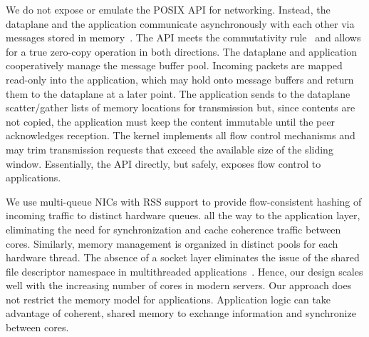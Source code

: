  We do
not expose or emulate the POSIX API for networking.  Instead, the
dataplane and the application communicate asynchronously with each
other via messages stored in
memory~\cite{DBLP:conf/osdi/HanMCR12,DBLP:journals/cacm/Rizzo12}.  The API meets the
commutativity rule~\cite{DBLP:conf/sosp/ClementsKZMK13} and allows for
a true zero-copy operation in both directions. The dataplane and
application cooperatively manage the message buffer pool. Incoming
packets are mapped read-only into the application, which may hold onto
message buffers and return them to the dataplane at a later point.
The application sends to the dataplane scatter/gather lists of memory
locations for transmission but, since contents are not copied, the
application must keep the content immutable until the peer
acknowledges reception. The kernel implements all flow control
mechanisms and may trim transmission requests that exceed the
available size of the sliding window.  Essentially, the API directly,
but safely, exposes flow control to applications.


 We use
multi-queue NICs with RSS support to provide flow-consistent hashing
of incoming traffic to distinct hardware queues.  all the way to the application layer,
eliminating the need for synchronization and cache coherence traffic
between cores. Similarly, memory management is organized in distinct
pools for each hardware thread. The absence of a socket layer
eliminates the issue of the shared file descriptor namespace in
multithreaded
applications~\cite{DBLP:conf/sosp/ClementsKZMK13}. Hence, our design
scales well with the increasing number of cores in modern servers. Our
approach does not restrict the memory model for
applications. Application logic can take advantage of coherent, shared
memory to exchange information and synchronize between cores.





